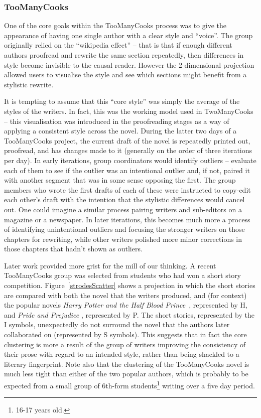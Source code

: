 \documentclass{article}
\begin{document}
\subsubsection{TooManyCooks}

One of the core goals within the TooManyCooks process was to give the appearance of having one single author with a clear style and ``voice''.  The group originally relied on the ``wikipedia effect'' -- that is that if enough different authors proofread and rewrite the same section repeatedly, then differences in style become invisible to the causal reader.   However the 2-dimensional projection allowed users to visualise the style and see which sections might benefit from a stylistic rewrite.

It is tempting to assume that this ``core style'' was simply the average of the styles of the writers. In fact, this was the working model used in  TwoManyCooks -- this visualisation was introduced in the proofreading stages as a way of applying a consistent style across the novel. During the latter two days of a TooManyCooks project, the current draft of the novel is repeatedly printed out, proofread, and has changes made to it (generally on the order of three iterations per day). In early iterations, group coordinators would identify outliers -- evaluate each of them to see if the outlier was an intentional outlier and, if not, paired it with another segment that was in some sense opposing the first.  The group members who wrote the first drafts of each of these were instructed to copy-edit each other's draft with the intention that the stylistic differences would cancel out.   One could imagine a similar process pairing writers and sub-editors on a magazine or a newspaper. In later iterations, this becomes much more a process of identifying unintentional outliers and focusing the stronger writers on those chapters for rewriting, while other writers polished more minor corrections in those chapters that hadn't shown as outliers.

Later work provided more grist for the mill of our thinking. A recent TooManyCooks group was selected from students who had won a short story competition. Figure~\ref{strodesScatter} shows a projection in which the short stories are compared with both the novel that the writers produced, and (for context) the popular novels {\em Harry Potter and the Half Blood Prince}~\cite{halfblood}, represented by H, and {\em Pride and Prejudice} \cite{Austen201205}, represented by P.   The short stories, represented by the I symbols, unexpectedly do not surround the novel that the authors later collaborated on (represented by S symbols).  This suggests that in fact the core clustering is more a result of the group of writers improving the consistency of their prose with regard to an intended style, rather than being shackled to a literary fingerprint.  Note also that the clustering of the TooManyCooks novel is much less tight than either of the two popular authors, which is probably to be expected from a small group of 6th-form students\footnote{16-17 years old.} writing over a five day period.  
\end{document}
